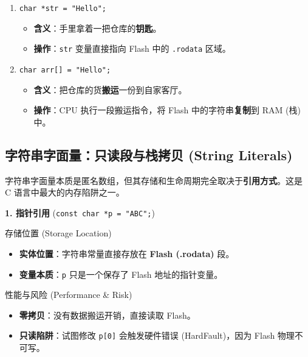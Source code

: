 \begin{enumerate}
    \item \texttt{char *str = "Hello";} 
    \begin{itemize}
        \item \textbf{含义}：手里拿着一把仓库的\textbf{钥匙}。
        \item \textbf{操作}：\texttt{str} 变量直接指向 Flash 中的 \texttt{.rodata} 区域。
    \end{itemize}
    
    \item \texttt{char arr[] = "Hello";}
    \begin{itemize}
        \item \textbf{含义}：把仓库的货\textbf{搬运}一份到自家客厅。
        \item \textbf{操作}：CPU 执行一段搬运指令，将 Flash 中的字符串\textbf{复制}到 RAM (栈) 中。
    \end{itemize}
\end{enumerate}










\subsection{字符串字面量：只读段与栈拷贝 (String Literals)}

字符串字面量本质是匿名数组，但其存储和生命周期完全取决于\textbf{引用方式}。这是 C 语言中最大的内存陷阱之一。

\textbf{1. 指针引用} (\texttt{const char *p = "ABC";})

    存储位置 (Storage Location)

    \begin{itemize}
        \item \textbf{实体位置}：字符串常量直接存放在 \textbf{Flash (.rodata)} 段。
        \item \textbf{变量本质}：\texttt{p} 只是一个保存了 Flash 地址的指针变量。
    \end{itemize}

    性能与风险 (Performance \& Risk)

    \begin{itemize}
        \item \textbf{零拷贝}：没有数据搬运开销，直接读取 Flash。
        \item \textbf{只读陷阱}：试图修改 \texttt{p[0]} 会触发硬件错误 (HardFault)，因为 Flash 物理不可写。
    \end{itemize}

